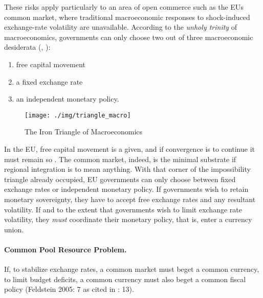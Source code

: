 \documentclass[11pt,a4paper,oneside,openright]{article}
\begin{document}
These risks apply particularly to an area of open commerce such as the \gls{EU}s common market, where traditional macroeconomic responses to shock-induced exchange-rate volatility are unavailable. According to the \emph{unholy trinity} of macroeconomics, governments can only choose two out of three macroeconomic desiderata (\citealt{Mundell1963}, \citealt{Fleming1962}):
\begin{enumerate}
	\item free capital movement
	\item a fixed exchange rate
	\item an independent monetary policy.
\end{enumerate}

 \begin{figure}[htbp]
	\centering
	\texttt{[image: ./img/triangle\_macro]}  
	\caption{The Iron Triangle of Macroeconomics}
	\label{fig:triangle_macro}
\end{figure} 

In the \gls{EU}, free capital movement is a given, and if convergence is to continue it must remain so \citep{Abiad2007}. The common market, indeed, is the minimal substrate if regional integration is to mean anything. With that corner of the impossibility triangle already occupied, \gls{EU} governments can only choose between fixed exchange rates or independent monetary policy. If governments wish to retain monetary sovereignty, they have to accept free exchange rates and any resultant volatility. If and to the extent that governments wish to limit exchange rate volatility, they \emph{must} coordinate their monetary policy, that is, enter a currency union.

\paragraph[Fiscal-CPR]{Common Pool Resource Problem.}  \label{sec:Fiscal-CPR} If, to stabilize exchange rates, a common market must beget a common currency, to limit budget deficits, a common currency must also beget a common fiscal policy (Feldstein 2005: 7 as cited in \citealt{Begg2008}: 13). 
\end{document}

